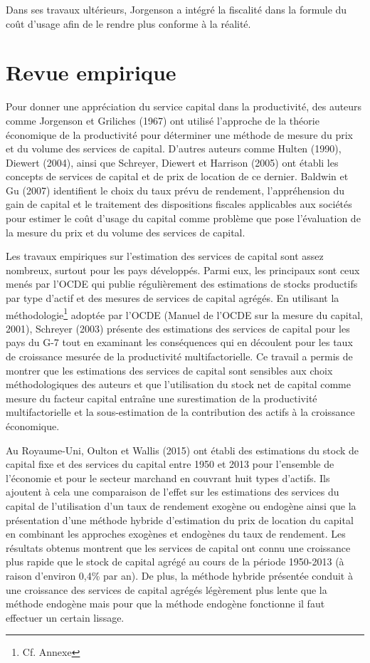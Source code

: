 \documentclass[12pt,a4paper,oneside]{report}
\begin{document}
Dans ses travaux ultérieurs, Jorgenson a intégré la fiscalité dans la formule du coût d’usage afin de le
rendre plus conforme à la réalité.

\section{Revue empirique}

Pour donner une appréciation du service capital dans la productivité, des auteurs comme Jorgenson et Griliches
(1967) ont utilisé l’approche de la théorie économique de la productivité pour déterminer une méthode de
mesure du prix et du volume des services de capital. D’autres auteurs comme Hulten (1990), Diewert (2004),
ainsi que Schreyer, Diewert et Harrison (2005) ont établi les concepts de services de capital et de prix de
location de ce dernier. Baldwin et Gu (2007) identifient le choix du taux prévu de rendement, l’appréhension
du gain de capital et le traitement des dispositions fiscales applicables aux sociétés pour estimer le coût
d’usage du capital comme problème que pose l’évaluation de la mesure du prix et du volume des services de
capital.

Les travaux empiriques sur l’estimation des services de capital sont assez nombreux, surtout pour les pays
développés. Parmi eux, les principaux sont ceux menés par l’OCDE qui publie régulièrement des estimations de
stocks productifs par type d’actif et des mesures de services de capital agrégés. En utilisant la
méthodologie\footnote{Cf. Annexe} adoptée par l’OCDE (Manuel de l’OCDE sur la mesure du capital, 2001),
Schreyer (2003) présente des estimations des services de capital pour les pays du G-7 tout en examinant les
conséquences qui en découlent pour les taux de croissance mesurée de la productivité multifactorielle. Ce
travail a permis de montrer que les estimations des services de capital sont sensibles aux choix
méthodologiques des auteurs et que l’utilisation du stock net de capital comme mesure du facteur capital
entraîne une surestimation de la productivité multifactorielle et la sous-estimation de la contribution des
actifs à la croissance économique.

Au Royaume-Uni, Oulton et Wallis (2015) ont établi des estimations du stock de capital fixe et des services du
capital entre 1950 et 2013 pour l’ensemble de l’économie et pour le secteur marchand en couvrant huit types
d’actifs. Ils ajoutent à cela une comparaison de l’effet sur les estimations des services du capital de
l’utilisation d’un taux de rendement exogène ou endogène ainsi que la présentation d’une méthode hybride
d’estimation du prix de location du capital en combinant les approches exogènes et endogènes du taux de
rendement. Les résultats obtenus montrent que les services de capital ont connu une croissance plus rapide que
le stock de capital agrégé au cours de la période 1950-2013 (à raison d’environ 0,4\% par an). De plus, la
méthode hybride présentée conduit à une croissance des services de capital agrégés légèrement plus lente que
la méthode endogène mais pour que la méthode endogène fonctionne il faut effectuer un certain lissage.
\end{document}
